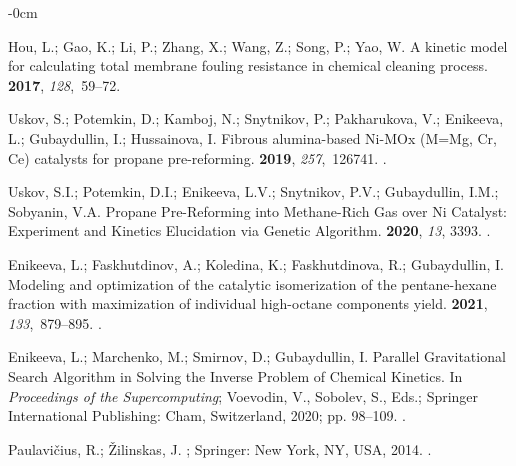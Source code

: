 \documentclass[mathematics,article,accept,pdftex,moreauthors]{Definitions/mdpi}
\begin{document}
\begin{adjustwidth}{-\extralength}{0cm}
\begin{thebibliography}{999}
Hou, L.; Gao, K.; Li, P.; Zhang, X.; Wang, Z.; Song, P.; Yao, W.
\newblock A kinetic model for calculating total membrane fouling resistance in
  chemical cleaning process.
 {\bf 2017}, {\em
  128},~59--72.

Uskov, S.; Potemkin, D.; Kamboj, N.; Snytnikov, P.; Pakharukova, V.; Enikeeva,
  L.; Gubaydullin, I.; Hussainova, I.
\newblock Fibrous alumina-based Ni-MOx (M=Mg, Cr, Ce) catalysts for propane
  pre-reforming.
 {\bf 2019}, {\em 257},~126741.
.

Uskov, S.I.; Potemkin, D.I.; Enikeeva, L.V.; Snytnikov, P.V.; Gubaydullin,
  I.M.; Sobyanin, V.A.
\newblock Propane Pre-Reforming into Methane-Rich Gas over Ni Catalyst:
  Experiment and Kinetics Elucidation via Genetic Algorithm.
 {\bf 2020}, {\em 13}, 3393.
.

Enikeeva, L.; Faskhutdinov, A.; Koledina, K.; Faskhutdinova, R.; Gubaydullin,
  I.
\newblock Modeling and optimization of the catalytic isomerization of the
  pentane-hexane fraction with maximization of individual high-octane
  components yield.
 {\bf 2021}, {\em
  133},~879--895.
.

Enikeeva, L.; Marchenko, M.; Smirnov, D.; Gubaydullin, I.
\newblock Parallel Gravitational Search Algorithm in Solving the Inverse
  Problem of Chemical Kinetics.
\newblock In \emph{Proceedings of the Supercomputing}; Voevodin, V., Sobolev, S.,
  Eds.; Springer International Publishing: Cham, Switzerland, 2020; pp. 98--109.
.

Paulavi{\v c}ius, R.; {\v Z}ilinskas, J.
; Springer: New York, NY, USA,  2014.
.


\end{thebibliography}
\end{adjustwidth}
\end{document}
